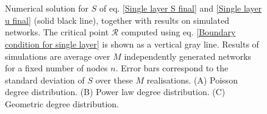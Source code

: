 \documentclass[
11pt, %
american, %
singlespacing, %
final, %
nolistspacing, %
liststotoc, %
headsepline, %
]{MastersDoctoralThesis} %
\begin{document}
{
\begin{figure}
	\\
	\\
	\caption{Numerical solution for $S$ of eq. \eqref{Single layer S final} and \eqref{Single layer u final} (solid black line), together with results on simulated networks. The critical point $\mathcal{R}$ computed using eq. \eqref{Boundary condition for single layer} is shown as a vertical gray line. Results of simulations are average over $M$ independently generated networks for a fixed number of nodes $n$. Error bars correspond to the standard deviation of $S$ over these $M$ realisations. (A) Poisson degree distribution. (B) Power law degree distribution. (C) Geometric degree distribution. }
	\label{Figure: Single layer S simulation}
\end{figure}
}
\end{document}
